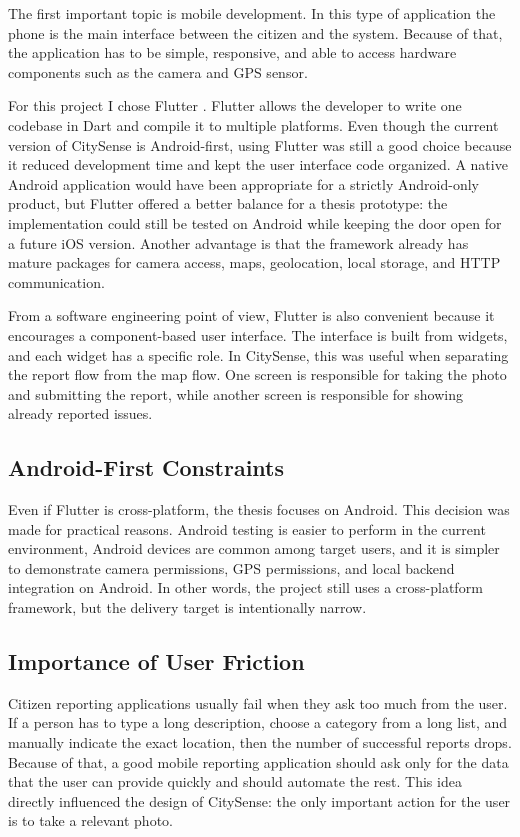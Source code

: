 The first important topic is mobile development. In this type of application the phone is the main interface between the citizen and the system. Because of that, the application has to be simple, responsive, and able to access hardware components such as the camera and GPS sensor.

For this project I chose Flutter \cite{flutter_docs}. Flutter allows the developer to write one codebase in Dart and compile it to multiple platforms. Even though the current version of CitySense is Android-first, using Flutter was still a good choice because it reduced development time and kept the user interface code organized. A native Android application would have been appropriate for a strictly Android-only product, but Flutter offered a better balance for a thesis prototype: the implementation could still be tested on Android while keeping the door open for a future iOS version. Another advantage is that the framework already has mature packages for camera access, maps, geolocation, local storage, and HTTP communication.

From a software engineering point of view, Flutter is also convenient because it encourages a component-based user interface. The interface is built from widgets, and each widget has a specific role. In CitySense, this was useful when separating the report flow from the map flow. One screen is responsible for taking the photo and submitting the report, while another screen is responsible for showing already reported issues.

\subsection{Android-First Constraints}

Even if Flutter is cross-platform, the thesis focuses on Android. This decision was made for practical reasons. Android testing is easier to perform in the current environment, Android devices are common among target users, and it is simpler to demonstrate camera permissions, GPS permissions, and local backend integration on Android. In other words, the project still uses a cross-platform framework, but the delivery target is intentionally narrow.

\subsection{Importance of User Friction}

Citizen reporting applications usually fail when they ask too much from the user. If a person has to type a long description, choose a category from a long list, and manually indicate the exact location, then the number of successful reports drops. Because of that, a good mobile reporting application should ask only for the data that the user can provide quickly and should automate the rest. This idea directly influenced the design of CitySense: the only important action for the user is to take a relevant photo.

